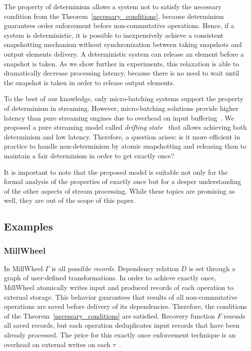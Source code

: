 The property of determinism allows a system not to satisfy the necessary condition from the Theorem~\ref{necessary_conditions}, because determinism guarantees order enforcement before non-commutative operations. Hence, if a system is deterministic, it is possible to inexpensively achieve a consistent snapshotting mechanism without synchronization between taking snapshots and output elements delivery. A deterministic system can release an element before a snapshot is taken. As we show further in experiments, this relaxation is able to dramatically decrease processing latency, because there is no need to wait until the snapshot is taken in order to release output elements.

To the best of our knowledge, only micro-batching systems support the property of determinism in streaming. However, micro-batching solutions provide higher latency than pure streaming engines due to overhead on input buffering~\cite{karimov2018benchmarking}. We proposed a pure streaming model called {\em drifting state}~\cite{we2018adbis} that allows achieving both determinism and low latency. Therefore, a question arises: is it more efficient in practice to handle non-determinism by atomic snapshotting and releasing than to maintain a fair determinism in order to get exactly once? 

It is important to note that the proposed model is suitable not only for the formal analysis of the properties of exactly once but for a deeper understanding of the other aspects of stream processing. While these topics are promising as well, they are out of the scope of this paper.

\subsection{Examples}

\subsubsection{MillWheel}

In MillWheel $\Gamma$ is all possible {\em records}. Dependency relation $D$ is set through a graph of user-defined transformations. In order to achieve exactly once, MillWheel atomically writes input and produced records of each operation to external storage. This behavior guarantees that results of all non-commutative operations are saved before delivery of its dependencies. Therefore, the conditions of the Theorem~\ref{necessary_conditions} are satisfied. Recovery function $F$ resends all saved records, but each operation deduplicates input records that have been already processed. The price for this exactly once enforcement technique is an overhead on external writes on each $\tau$~\cite{Akidau:2013:MFS:2536222.2536229}.    

